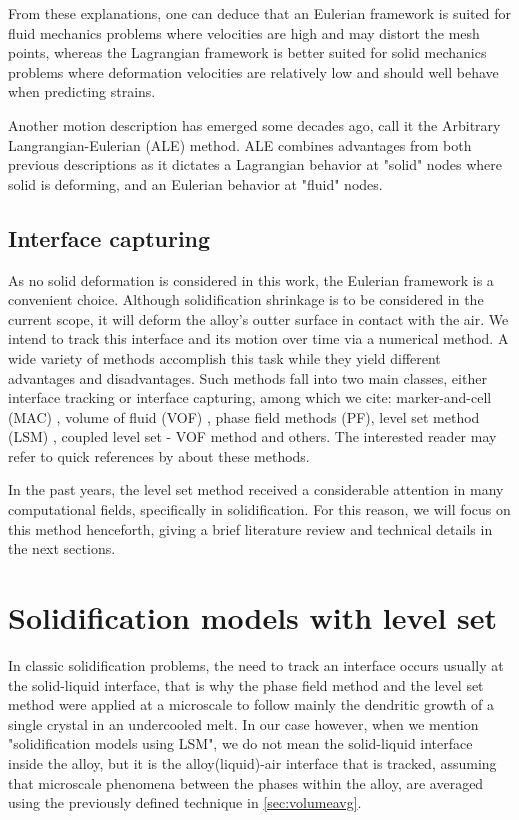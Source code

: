 From these explanations, one can deduce that an Eulerian framework is suited for fluid mechanics problems where 
velocities are high and may distort the mesh points, whereas the Lagrangian framework is better suited for solid mechanics 
problems where deformation velocities are relatively low and should well behave when predicting strains.

Another motion description has emerged some decades ago, \citet{hirt_arbitrary_1971} call it the Arbitrary Langrangian-Eulerian (ALE) method. 
ALE combines advantages from both previous descriptions as it dictates a Lagrangian behavior at "solid" nodes where solid is deforming, and
an Eulerian behavior at "fluid" nodes.
%
%
\subsection{Interface capturing}
As no solid deformation is considered in this work, the Eulerian framework is a convenient choice. Although solidification shrinkage is 
to be considered in the current scope, it will deform the alloy's outter surface in contact with the air.
We intend to track this interface and its motion over time via a numerical method. A wide variety of methods accomplish this 
task while they yield different advantages and disadvantages. Such methods fall into two main classes, either interface tracking
or interface capturing, among which we cite: marker-and-cell (MAC) \citep{harlow_numerical_1965}, volume of fluid (VOF) \citep{hirt_volume_1981}, 
phase field methods (PF), level set method (LSM) \citep{osher_fronts_1988}, coupled level set - VOF method and others. 
The interested reader may refer to quick references by \citet{prosperetti_navier-stokes_2002,maitre_review_2006} about these methods.

In the past years, the level set method received a considerable attention in many computational fields, specifically in solidification.
For this reason, we will focus on this method henceforth, giving a brief literature review and technical details in the next sections.
%
\section{Solidification models with level set}
In classic solidification problems, the need to track an interface occurs usually at the solid-liquid interface, that is why the phase field
method \citep{karma_phase-field_1996,boettinger_phase-field_2002} and the level set method \citep{chen_simple_1997,gibou_level_2003,tan_level_2007} 
were applied at a microscale to follow mainly the dendritic growth of a single crystal in an undercooled melt.
In our case however, when we mention "solidification models using LSM", we 
do not mean the solid-liquid interface inside the alloy, but it is the alloy(liquid)-air interface that is tracked, assuming that microscale
phenomena between the phases within the alloy, are averaged using the previously defined technique in \cref{sec:volumeavg}.


